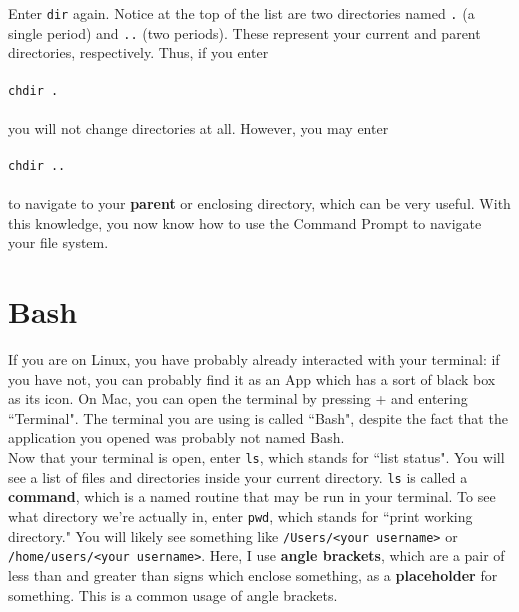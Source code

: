 \documentclass{article}
\begin{document}
Enter \verb|dir| again. Notice at the top of the list are two directories named \verb|.| (a single period) and 
\verb|..| (two periods). These 
represent your current and parent directories, respectively. Thus, if you enter \\ \\
\verb|chdir .| \\ \\
you will not change directories at all. 
However, you may enter \\ \\
\verb|chdir ..| \\ \\
to navigate to your \textbf{parent} or enclosing directory,
which can be very useful. With this knowledge, you now know how to use the Command Prompt to navigate your file system.

\section*{Bash}
If you are on Linux, you have probably already interacted with your terminal: if you have not, you can probably find it 
as an App which has a sort of black box as its icon. On Mac, you can open the terminal by pressing \cmdkey + \Spacebar
and entering ``Terminal". The terminal you are using is called ``Bash", despite the fact that the application you opened
was probably not named Bash. \\

Now that your terminal is open, enter \verb|ls|, which stands for ``list status". You will see a list of files and 
directories inside your current 
directory. \verb|ls| is called a \textbf{command}, which is a named routine that may be run in your terminal. To see
what directory we're actually in, enter \verb|pwd|, which stands for ``print working directory." You will likely see
something like \verb|/Users/<your username>| or \verb|/home/users/<your username>|. Here, I use \textbf{angle brackets},
which are a pair of less than and greater than signs which enclose something, as a \textbf{placeholder} for something.
This is a common usage of angle brackets. \\
\end{document}
